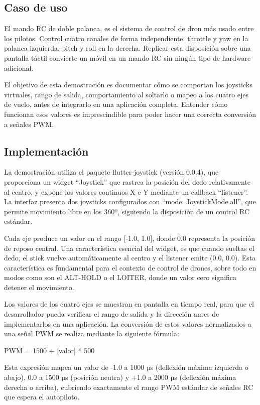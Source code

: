 \subsection{Caso de uso}

El mando RC de doble palanca, es el sistema de control de dron más usado entre los pilotos. Control cuatro canales de forma independiente: throttle y yaw en la palanca izquierda, pitch y roll en la derecha. Replicar esta disposición sobre una pantalla táctil convierte un móvil en un mando RC sin ningún tipo de hardware adicional.

El objetivo de esta demostración es documentar cómo se comportan los joysticks virtuales, rango de salida, comportamiento al soltarlo o mapeo a los cuatro ejes de vuelo, antes de integrarlo en una aplicación completa. Entender cómo funcionan esos valores es imprescindible para poder hacer una correcta conversión a señales PWM. 

\subsection{Implementación}
La demostración utiliza el paquete flutter-joystick (versión 0.0.4), que proporciona un widget “Joystick” que rastrea la posición del dedo relativamente al centro, y expone los valores continuos X e Y mediante un callback “listener”. La interfaz presenta dos joysticks configurados con “mode: JoystickMode.all”, que permite movimiento libre en los 360º, siguiendo la disposición de un control RC estándar.

Cada eje produce un valor en el rango [-1.0, 1.0], donde 0.0 representa la posición de reposo central. Una característica esencial del widget, es que cuando sueltas el dedo, el stick vuelve automáticamente al centro y el listener emite (0.0, 0.0). Esta característica es fundamental para el contexto de control de drones, sobre todo en modos como son el ALT-HOLD o el LOITER, donde un valor cero significa detener el movimiento.

Los valores de los cuatro ejes se muestran en pantalla en tiempo real, para que el desarrollador pueda verificar el rango de salida y la dirección antes de implementarlos en una aplicación. La conversión de estos valores normalizados a una señal PWM se realiza mediante la siguiente fórmula:

PWM = 1500 + [valor] * 500

Esta expresión mapea un valor de -1.0 a 1000 µs (deflexión máxima izquierda o abajo), 0.0 a 1500 µs (posición neutra) y +1.0 a 2000 µs (deflexión máxima derecha o arriba), cubriendo exactamente el rango PWM estándar de señales RC que espera el autopiloto.

